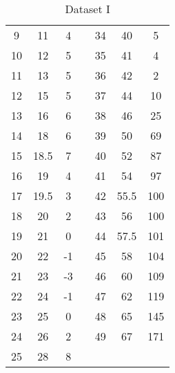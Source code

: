 \begin{table}[H]
{\begin{tabular}{|c|c|c|cccc}
	9 & 11 & 4 & \multicolumn{1}{c|}{} & \multicolumn{1}{c|}{34} & \multicolumn{1}{c|}{40} & \multicolumn{1}{c|}{5} \\ \cline{1-3} \cline{5-7} 
	10 & 12 & 5 & \multicolumn{1}{c|}{} & \multicolumn{1}{c|}{35} & \multicolumn{1}{c|}{41} & \multicolumn{1}{c|}{4} \\ \cline{1-3} \cline{5-7} 
	11 & 13 & 5 & \multicolumn{1}{c|}{} & \multicolumn{1}{c|}{36} & \multicolumn{1}{c|}{42} & \multicolumn{1}{c|}{2} \\ \cline{1-3} \cline{5-7} 
	12 & 15 & 5 & \multicolumn{1}{c|}{} & \multicolumn{1}{c|}{37} & \multicolumn{1}{c|}{44} & \multicolumn{1}{c|}{10} \\ \cline{1-3} \cline{5-7} 
	13 & 16 & 6 & \multicolumn{1}{c|}{} & \multicolumn{1}{c|}{38} & \multicolumn{1}{c|}{46} & \multicolumn{1}{c|}{25} \\ \cline{1-3} \cline{5-7} 
	14 & 18 & 6 & \multicolumn{1}{c|}{} & \multicolumn{1}{c|}{39} & \multicolumn{1}{c|}{50} & \multicolumn{1}{c|}{69} \\ \cline{1-3} \cline{5-7} 
	15 & 18.5 & 7 & \multicolumn{1}{c|}{} & \multicolumn{1}{c|}{40} & \multicolumn{1}{c|}{52} & \multicolumn{1}{c|}{87} \\ \cline{1-3} \cline{5-7} 
	16 & 19 & 4 & \multicolumn{1}{c|}{} & \multicolumn{1}{c|}{41} & \multicolumn{1}{c|}{54} & \multicolumn{1}{c|}{97} \\ \cline{1-3} \cline{5-7} 
	17 & 19.5 & 3 & \multicolumn{1}{c|}{} & \multicolumn{1}{c|}{42} & \multicolumn{1}{c|}{55.5} & \multicolumn{1}{c|}{100} \\ \cline{1-3} \cline{5-7} 
	18 & 20 & 2 & \multicolumn{1}{c|}{} & \multicolumn{1}{c|}{43} & \multicolumn{1}{c|}{56} & \multicolumn{1}{c|}{100} \\ \cline{1-3} \cline{5-7} 
	19 & 21 & 0 & \multicolumn{1}{c|}{} & \multicolumn{1}{c|}{44} & \multicolumn{1}{c|}{57.5} & \multicolumn{1}{c|}{101} \\ \cline{1-3} \cline{5-7} 
	20 & 22 & -1 & \multicolumn{1}{c|}{} & \multicolumn{1}{c|}{45} & \multicolumn{1}{c|}{58} & \multicolumn{1}{c|}{104} \\ \cline{1-3} \cline{5-7} 
	21 & 23 & -3 & \multicolumn{1}{c|}{} & \multicolumn{1}{c|}{46} & \multicolumn{1}{c|}{60} & \multicolumn{1}{c|}{109} \\ \cline{1-3} \cline{5-7} 
	22 & 24 & -1 & \multicolumn{1}{c|}{} & \multicolumn{1}{c|}{47} & \multicolumn{1}{c|}{62} & \multicolumn{1}{c|}{119} \\ \cline{1-3} \cline{5-7} 
	23 & 25 & 0 & \multicolumn{1}{c|}{} & \multicolumn{1}{c|}{48} & \multicolumn{1}{c|}{65} & \multicolumn{1}{c|}{145} \\ \cline{1-3} \cline{5-7} 
	24 & 26 & 2 & \multicolumn{1}{c|}{} & \multicolumn{1}{c|}{49} & \multicolumn{1}{c|}{67} & \multicolumn{1}{c|}{171} \\ \cline{1-3} \cline{5-7} 
	25 & 28 & 8 &  &  &  &  \\ \cline{1-3}
	\end{tabular}%
	}
	\caption{Dataset I}
	\label{tab:1}
\end{table}